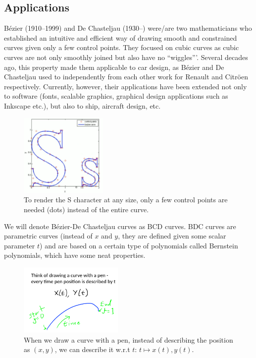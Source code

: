 \documentclass[a4paper]{article}
\begin{document}
\subsection{Applications}
B\'ezier (1910--1999) and De Chasteljau (1930--) were/are two mathematicians who established an intuitive and efficient way of drawing smooth and constrained curves given only a few control points. They focused on cubic curves as cubic curves are not only smoothly joined but also have no ``wiggles'''. Several decades ago, this property made them applicable to car design, as B\'ezier and De Chasteljau used to independently from each other work for Renault and Citr\"oen respectively. Currently, however, their applications have been extended not only to software (fonts, scalable graphics, graphical design applications such as Inkscape etc.), but also to ship, aircraft design, etc.
\begin{figure}[H]
    \centering
    \includegraphics[height=4cm]{img/bezier/s_letter_control_points.png}
    \caption{To render the S character at any size, only a few control points are needed (dots) instead of the entire curve.}%
\end{figure}
We will denote B\'ezier-De Chasteljau curves as BCD curves. BDC curves are parametric curves (instead of $x$ and $y$, they are defined given some scalar parameter $t$) and are based on a certain type of polynomials called Bernstein polynomials, which have some neat properties.
\begin{figure}[H]
    \centering
    \includegraphics[height=3.5cm]{img/bezier/pen_paper.png}
    \caption{When we draw a curve with a pen, instead of describing the position as $(x,y)$, we can describe it w.r.t $t$: $t\mapsto x(t), y(t)$.}%
    \label{fig:name}
\end{figure}
\end{document}
